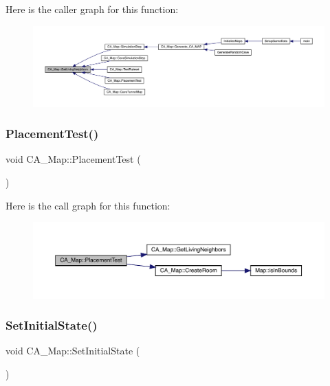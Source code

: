 Here is the caller graph for this function\+:
\nopagebreak
\begin{figure}[H]
\begin{center}
\leavevmode
\includegraphics[width=350pt]{class_c_a___map_ad57529f17a77b590fe93839c4b8bd5f9_icgraph}
\end{center}
\end{figure}
\mbox{\label{class_c_a___map_a142fc34721fe8d06cc93b61a27af9bda}} 
\subsubsection{\texorpdfstring{Placement\+Test()}{PlacementTest()}}
{\footnotesize\ttfamily void C\+A\+\_\+\+Map\+::\+Placement\+Test (\begin{DoxyParamCaption}{ }\end{DoxyParamCaption})}

Here is the call graph for this function\+:
\nopagebreak
\begin{figure}[H]
\begin{center}
\leavevmode
\includegraphics[width=350pt]{class_c_a___map_a142fc34721fe8d06cc93b61a27af9bda_cgraph}
\end{center}
\end{figure}
\mbox{\label{class_c_a___map_ad4c6a5b3ca7121d6c4593061d4bf3056}} 
\subsubsection{\texorpdfstring{Set\+Initial\+State()}{SetInitialState()}}
{\footnotesize\ttfamily void C\+A\+\_\+\+Map\+::\+Set\+Initial\+State (\begin{DoxyParamCaption}{ }\end{DoxyParamCaption})}

